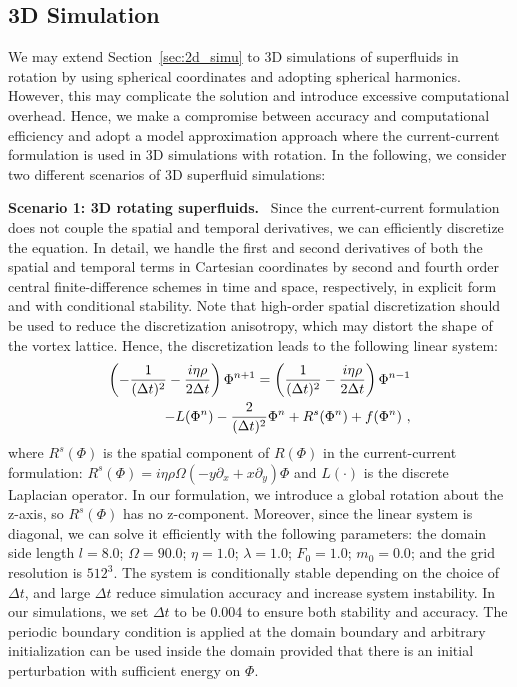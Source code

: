 \documentclass[10pt,journal,compsoc,twoside]{IEEEtran}
\begin{document}

	\subsection{3D Simulation}
	\label{sec:3d_simu}
	
	We may extend Section~\ref{sec:2d_simu} to 3D simulations of superfluids in rotation by using spherical coordinates and adopting spherical harmonics.
	However, this may complicate the solution and introduce excessive computational overhead.
	Hence, we make a compromise between accuracy and computational efficiency and adopt a model approximation approach where the current-current formulation is used in 3D simulations with rotation.
	In the following, we consider two different scenarios of 3D superfluid simulations:
	
	
	
	\vspace{0.15cm}
	\noindent
	\textbf{Scenario 1: 3D rotating superfluids.} \
	Since the current-current formulation does not couple the spatial and temporal derivatives, we can efficiently discretize the equation.
	In detail, we handle the first and second derivatives of both the spatial and temporal terms in Cartesian coordinates by second and fourth order central finite-difference schemes in time and space, respectively, in explicit form and with conditional stability.
	Note that high-order spatial discretization should be used to reduce the discretization anisotropy, which may distort the shape of the vortex lattice.
	Hence, the discretization leads to the following linear system:
	\begin{eqnarray}
		\left( - \frac{1}{(\Delta t)^2} -\frac{i\eta\rho}{2\Delta t} \right) \Phi^{n+1} 
		= \left( \frac{1}{(\Delta t)^2} -\frac{i\eta\rho}{2\Delta t} \right) \Phi^{n-1} \cr
		- L(\Phi^n)  - \frac{2}{(\Delta t)^2} \Phi^n + R^s(\Phi^n) + f(\Phi^n) \ ,
	\end{eqnarray}
	where $R^s(\Phi)$ is the spatial component of $R(\Phi)$ in the current-current formulation: $R^s(\Phi) = i \eta \rho \Omega (-y\partial_x + x\partial_y) \Phi$ and $L(\cdot)$ is the discrete Laplacian operator.
	In our formulation, we introduce a global rotation about the z-axis, so $R^s(\Phi)$ has no z-component.
	Moreover, since the linear system is diagonal, we can solve it efficiently with the following parameters: the domain side length $l=8.0$; $\Omega=90.0$; $\eta=1.0$; $\lambda=1.0$; $F_0=1.0$; $m_0=0.0$; and the grid resolution is $512^3$.
	The system is conditionally stable depending on the choice of $\Delta t$, and large $\Delta t$ reduce simulation accuracy and increase system instability.
	In our simulations, we set $\Delta t$ to be 0.004 to ensure both stability and accuracy.
	The periodic boundary condition is applied at the domain boundary and arbitrary initialization can be used inside the domain provided that there is an initial perturbation with sufficient energy on $\Phi$.
	
\end{document}
